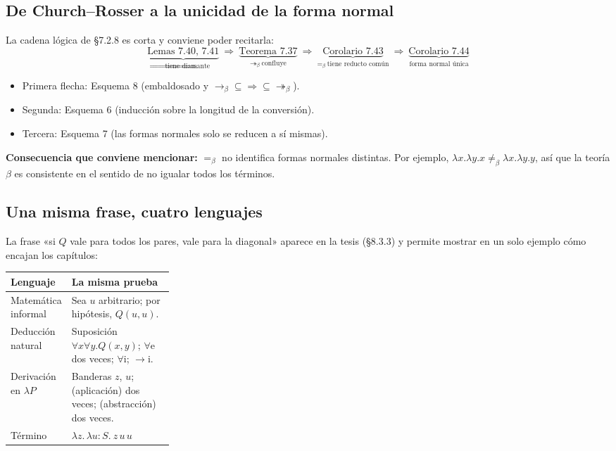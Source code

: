 \documentclass[11pt,a4paper]{article}
\newcommand{\bred}{\rightarrow_\beta}
\newcommand{\bmred}{\twoheadrightarrow_\beta}
\newcommand{\beq}{=_\beta}
\newcommand{\pr}{\Rightarrow}
\begin{document}
\subsection{De Church--Rosser a la unicidad de la forma normal}

La cadena lógica de §7.2.8 es corta y conviene poder recitarla:
\[
\underbrace{\text{Lemas 7.40, 7.41}}_{\pr\ \text{tiene diamante}}
\ \Longrightarrow\
\underbrace{\text{Teorema 7.37}}_{\bmred\ \text{confluye}}
\ \Longrightarrow\
\underbrace{\text{Corolario 7.43}}_{\beq\ \text{tiene reducto común}}
\ \Longrightarrow\
\underbrace{\text{Corolario 7.44}}_{\text{forma normal única}}
\]
\begin{itemize}
  \item Primera flecha: Esquema 8 (embaldosado y \(\bred\subseteq\pr\subseteq\bmred\)).
  \item Segunda: Esquema 6 (inducción sobre la longitud de la conversión).
  \item Tercera: Esquema 7 (las formas normales solo se reducen a sí mismas).
\end{itemize}
\textbf{Consecuencia que conviene mencionar:} \(\beq\) no identifica formas
normales distintas. Por ejemplo, \(\lambda x.\lambda y.x\not\beq\lambda x.\lambda y.y\),
así que la teoría \(\beta\) es consistente en el sentido de no igualar todos los
términos.

\subsection{Una misma frase, cuatro lenguajes}

La frase «si \(Q\) vale para todos los pares, vale para la diagonal» aparece
en la tesis (§8.3.3) y permite mostrar en un solo ejemplo cómo encajan los
capítulos:
\begin{center}
\renewcommand{\arraystretch}{1.3}
\begin{tabularx}{\linewidth}{@{}p{0.27\linewidth}X@{}}
\toprule
\textbf{Lenguaje} & \textbf{La misma prueba}\\
\midrule
Matemática informal & Sea \(u\) arbitrario; por hipótesis, \(Q(u,u)\).\\
Deducción natural & Suposición \(\forall x\forall y.Q(x,y)\); \(\forall\)e dos veces; \(\forall\)i; \(\to\)i.\\
Derivación en \(\lambda P\) & Banderas \(z\), \(u\); (aplicación) dos veces; (abstracción) dos veces.\\
Término & \(\lambda z.\,\lambda u{:}S.\ z\,u\,u\)\\
\bottomrule
\end{tabularx}
\end{center}
\end{document}
